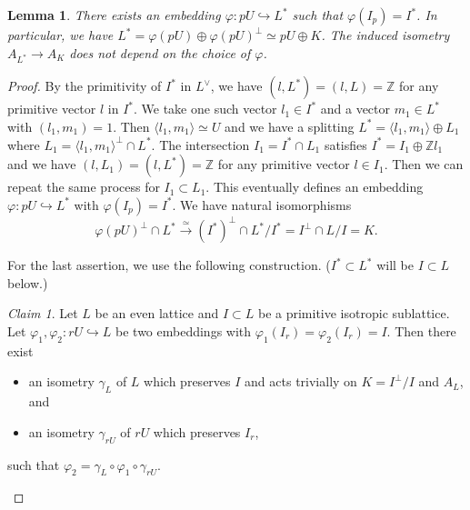 \documentclass[12pt]{amsart}
\numberwithin{equation}{section}
\newtheorem{lemma}[theorem]{Lemma}
\theoremstyle{definition}
\theoremstyle{remark}
\newtheorem{claim}[theorem]{Claim}
\newcommand{\Z}{\mathbb{Z}}
\begin{document}
\begin{lemma}\label{lem: overlattice split}
There exists an embedding $\varphi\colon pU \hookrightarrow L^{\ast}$ 
such that $\varphi(I_{p})=I^{\ast}$.  
In particular, we have 
$L^{\ast} = \varphi(pU)\oplus \varphi(pU)^{\perp} \simeq pU\oplus K$. 
The induced isometry 
$A_{L^{\ast}}\to A_{K}$ 
does not depend on the choice of $\varphi$.  
\end{lemma}

\begin{proof}
By the primitivity of $I^{\ast}$ in $L^{\vee}$, 
we have $(l, L^{\ast})=(l, L)={\Z}$ for any primitive vector $l$ in $I^{\ast}$. 
We take one such vector $l_1\in I^{\ast}$ and a vector $m_1\in L^{\ast}$ with $(l_1, m_1)=1$. 
Then $\langle l_1, m_1 \rangle \simeq U$ and 
we have a splitting $L^{\ast}=\langle l_1, m_1 \rangle \oplus L_{1}$ 
where $L_{1}=\langle l_1, m_1 \rangle^{\perp}\cap L^{\ast}$. 
The intersection 
$I_{1}=I^{\ast}\cap L_{1}$ satisfies $I^{\ast}=I_{1}\oplus {\Z}l_{1}$ 
and we have 
$(l, L_{1})=(l, L^{\ast})={\Z}$ for any primitive vector $l\in I_{1}$. 
Then we can repeat the same process for $I_{1}\subset L_{1}$. 
This eventually defines an embedding $\varphi\colon pU\hookrightarrow L^{\ast}$ with 
$\varphi(I_{p})=I^{\ast}$. 
We have natural isomorphisms 
\begin{equation*}
\varphi(pU)^{\perp}\cap L^{\ast} \stackrel{\simeq}{\to} 
(I^{\ast})^{\perp}\cap L^{\ast}/I^{\ast} = I^{\perp}\cap L/I =K. 
\end{equation*}

For the last assertion, we use the following construction. 
($I^{\ast}\subset L^{\ast}$ will be $I\subset L$ below.) 

\begin{claim}\label{claim: AL AK}
Let $L$ be an even lattice and $I\subset L$ be a primitive isotropic sublattice. 
Let $\varphi_{1}, \varphi_{2} \colon rU \hookrightarrow L$ 
be two embeddings with 
$\varphi_{1}(I_{r})=\varphi_{2}(I_{r})=I$. 
Then there exist 
\begin{itemize}
\item an isometry $\gamma_{L}$ of $L$ which preserves $I$ and acts trivially on $K=I^{\perp}/I$ and $A_{L}$, and 
\item an isometry $\gamma_{rU}$ of $rU$ which preserves $I_{r}$, 
\end{itemize}
such that $\varphi_{2}=\gamma_{L} \circ \varphi_{1} \circ \gamma_{rU}$. 
\end{claim}


\end{proof}
\end{document}
